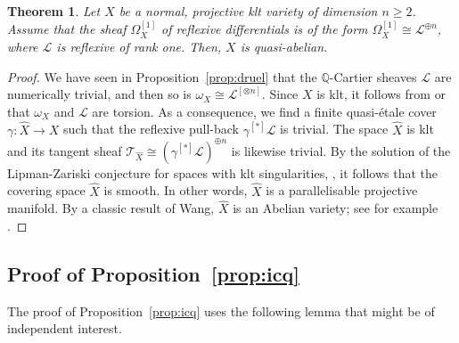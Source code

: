 \documentclass[11pt]{article}
\let\scr\mathscr
\theoremstyle{plain}
\newtheorem{thm}{Theorem}[section]
\theoremstyle{definition}
\numberwithin{equation}{thm}
\numberwithin{enumi}{thm}
\newcommand{\sL}{\scr{L}}
\newcommand{\sT}{\scr{T}}
\newcommand{\bQ}{\mathbb{Q}}
\let\what\widehat
\begin{document}
\begin{thm}\label{thm:druel}
Let $X$ be a normal, projective klt variety of dimension $n \geq 2$. Assume that
the sheaf $\Omega^{[1]}_X$ of reflexive differentials is of the form
$\Omega^{[1]}_X \cong \sL^{\oplus n}$, where $\sL$ is reflexive of rank one. Then, $X$ is
quasi-abelian.
\end{thm}
\begin{proof}
We have seen in Proposition~\ref{prop:druel} that the $\bQ$-Cartier sheaves $\sL$
are numerically trivial, and then so is $\omega_X \cong \sL^{[\otimes n]}$. Since $X$ is klt,
it follows from \cite[Prop.\,V.4.9]{Nakayama04} or \cite[Th.\,4.2]{MR2134273}
that $\omega_X$ and $\sL$ are torsion. As a consequence, we find a finite
quasi-étale cover $\gamma: \what{X} \to X$ such that the reflexive pull-back
$\gamma^{[*]} \sL$ is trivial. The space $\what{X}$ is klt and its tangent sheaf
$\sT_{\what{X}} \cong \left(\gamma^{[*]} \sL \right)^{\oplus n}$ is likewise trivial. By the
solution of the Lipman-Zariski conjecture for spaces with klt singularities,
\cite[Th.\,6]{GKKP11}, it follows that the covering space $\what{X}$ is
smooth. In other words, $\what{X}$ is a parallelisable projective manifold.
By a classic result of Wang, $\what{X}$ is an Abelian variety; see for example
\cite[\S 3.9, Lem.\,1]{MR1334091}.
\end{proof}

\subsection{Proof of Proposition~\ref*{prop:icq}}
\label{ssec:popicq}

The proof of Proposition~\ref{prop:icq} uses the following lemma that might be
of independent interest.
\end{document}
